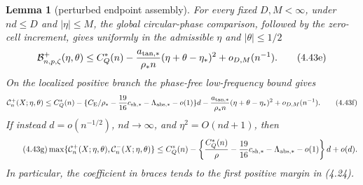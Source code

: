 \documentclass[11pt,a4paper]{article}
\numberwithin{equation}{section}
\newtheorem{lemma}[theorem]{Lemma}
\theoremstyle{definition}
\theoremstyle{remark}
\newcommand{\CE}{C_{\mathrm E}}
\begin{document}
\begin{lemma}[perturbed endpoint assembly]
For every fixed $D,M<\infty$, under $nd\le D$ and $|\eta|\le M$, the
global circular-phase comparison, followed by the zero-cell increment,
gives uniformly in the admissible $\eta$ and $|\theta|\le1/2$
\[
 \mathcal B^+_{n,p,\zeta}(\eta,\theta)
 \le C_Q^*(n)-{a_{\rm tan,*}\over\rho_*n}
          (\eta+\theta-\eta_*)^2+o_{D,M}(n^{-1}).      \tag{4.43e}
\]
On the localized positive branch the phase-free low-frequency bound gives
\[
 \mathcal C_n^+(X;\eta,\theta)
 \le C_Q^*(n)-\{\CE/\rho_*-{19\over16}c_{\rm sh,*}
                   -\Lambda_{\rm abs,*}-o(1)\}d
 -{a_{\rm tan,*}\over\rho_*n}(\eta+\theta-\eta_*)^2
 +o_{D,M}(n^{-1}).
                                                                  \tag{4.43f}
\]
If instead $d=o(n^{-1/2})$, $nd\to\infty$, and
$\eta^2=O(nd+1)$, then
\begin{equation}\tag{4.43g}
 \max\{\mathcal C_n^+(X;\eta,\theta),
          \mathcal C_n^-(X;\eta,\theta)\}
 \le C_Q^*(n)-
 \left\{{C_Q^*(n)\over\rho}
          -{19\over16}c_{\rm sh,*}
          -\Lambda_{\rm abs,*}-o(1)\right\}d+o(d).
\end{equation}
In particular, the coefficient in braces tends to the first positive
margin in (4.24).
\end{lemma}
\end{document}
